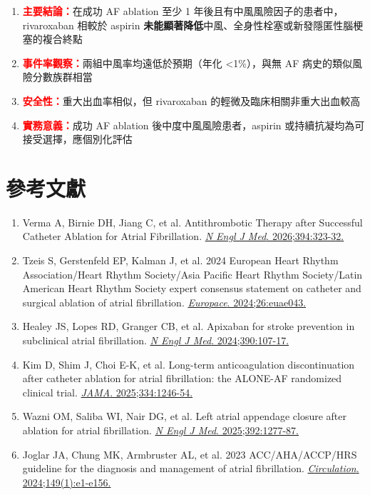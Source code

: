 \documentclass[12pt,a4paper]{article}
\begin{document}
\begin{enumerate}
    \item \textcolor{red}{\textbf{主要結論：}}在成功 AF ablation 至少 1 年後且有中風風險因子的患者中，rivaroxaban 相較於 aspirin \textbf{未能顯著降低}中風、全身性栓塞或新發隱匿性腦梗塞的複合終點

    \item \textcolor{red}{\textbf{事件率觀察：}}兩組中風率均遠低於預期（年化 <1\%），與無 AF 病史的類似風險分數族群相當

    \item \textcolor{red}{\textbf{安全性：}}重大出血率相似，但 rivaroxaban 的輕微及臨床相關非重大出血較高

    \item \textcolor{red}{\textbf{實務意義：}}成功 AF ablation 後中度中風風險患者，aspirin 或持續抗凝均為可接受選擇，應個別化評估
\end{enumerate}

\section{參考文獻}

\begin{enumerate}
    \item Verma A, Birnie DH, Jiang C, et al. Antithrombotic Therapy after Successful Catheter Ablation for Atrial Fibrillation. \href{https://doi.org/10.1056/NEJMoa2509688}{\textit{N Engl J Med}. 2026;394:323-32.}

    \item Tzeis S, Gerstenfeld EP, Kalman J, et al. 2024 European Heart Rhythm Association/Heart Rhythm Society/Asia Pacific Heart Rhythm Society/Latin American Heart Rhythm Society expert consensus statement on catheter and surgical ablation of atrial fibrillation. \href{https://doi.org/10.1093/europace/euae043}{\textit{Europace}. 2024;26:euae043.}

    \item Healey JS, Lopes RD, Granger CB, et al. Apixaban for stroke prevention in subclinical atrial fibrillation. \href{https://doi.org/10.1056/NEJMoa2310234}{\textit{N Engl J Med}. 2024;390:107-17.}

    \item Kim D, Shim J, Choi E-K, et al. Long-term anticoagulation discontinuation after catheter ablation for atrial fibrillation: the ALONE-AF randomized clinical trial. \href{https://doi.org/10.1001/jama.2025.0001}{\textit{JAMA}. 2025;334:1246-54.}

    \item Wazni OM, Saliba WI, Nair DG, et al. Left atrial appendage closure after ablation for atrial fibrillation. \href{https://doi.org/10.1056/NEJMoa2500001}{\textit{N Engl J Med}. 2025;392:1277-87.}

    \item Joglar JA, Chung MK, Armbruster AL, et al. 2023 ACC/AHA/ACCP/HRS guideline for the diagnosis and management of atrial fibrillation. \href{https://doi.org/10.1161/CIR.0000000000001193}{\textit{Circulation}. 2024;149(1):e1-e156.}
\end{enumerate}
\end{document}
